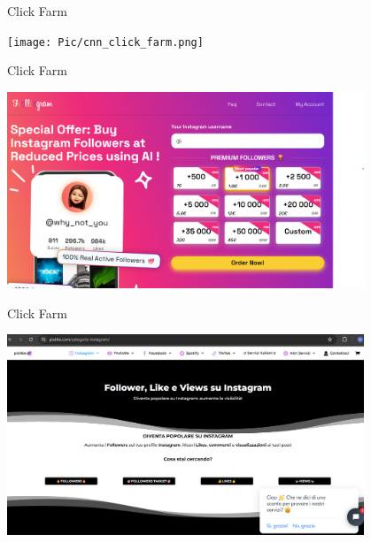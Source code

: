 \documentclass[11pt]{beamer}
\begin{document}
\begin{frame}{Click Farm \cite{clickfarm}}

\begin{center}
\texttt{[image: Pic/cnn\_click\_farm.png]}
\end{center}

\end{frame}



\begin{frame}{Click Farm }

\begin{center}
\includegraphics[width=0.8\textwidth]{Pic/compra_account_instagram.png}
\end{center}

\end{frame}

\begin{frame}{Click Farm }

\begin{center}
\includegraphics[width=0.8\textwidth]{Pic/compra_account_instagram_2.png}
\end{center}

\end{frame}
\end{document}
